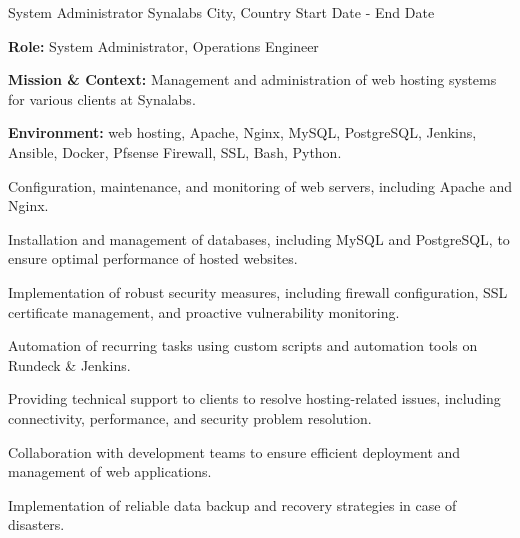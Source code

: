 \begin{cventries}
\cventry
{System Administrator} %
{Synalabs} %
{City, Country} %
{Start Date - End Date} %
{
  \begin{cvitems} %
    \item {\textbf{Role:} System Administrator, Operations Engineer}
    \item {\textbf{Mission \& Context:} Management and administration of web hosting systems for various clients at Synalabs.}
    \item {\textbf{Environment:} web hosting, Apache, Nginx, MySQL, PostgreSQL, Jenkins, Ansible, Docker, Pfsense Firewall, SSL, Bash, Python.} 
    \item {Configuration, maintenance, and monitoring of web servers, including Apache and Nginx.}
    \item {Installation and management of databases, including MySQL and PostgreSQL, to ensure optimal performance of hosted websites.}
    \item {Implementation of robust security measures, including firewall configuration, SSL certificate management, and proactive vulnerability monitoring.}
    \item {Automation of recurring tasks using custom scripts and automation tools on Rundeck \& Jenkins.}
    \item {Providing technical support to clients to resolve hosting-related issues, including connectivity, performance, and security problem resolution.}
    \item {Collaboration with development teams to ensure efficient deployment and management of web applications.}
    \item {Implementation of reliable data backup and recovery strategies in case of disasters.}
  \end{cvitems}
}


\end{cventries}
